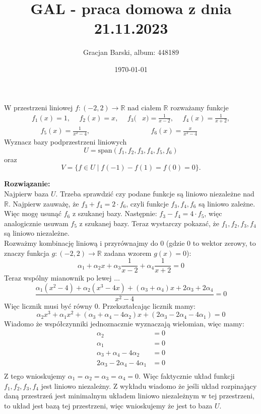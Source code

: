 \documentclass[11pt]{article}
\title{GAL - praca domowa z dnia 21.11.2023}
\author{Gracjan Barski, album: 448189}
\date{\today}
\newcommand{\R}{\mathbb{R}}
\newcommand{\al}{\alpha}
\begin{document}
\maketitle
\begin{center}
W przestrzeni liniowej $f\colon (-2, 2) \to \R$ nad ciałem $\R$ rozważamy funkcje
\begin{align*}
f_1(x) = 1, \hspace{15pt} f_2(x) = x, \hspace{15pt} f_3(&x) = \frac{1}{x-2}, \hspace{15pt} f_4(x) = \frac{1}{x+2}, \\  \hspace{15pt} f_5(x) = \frac{1}{x^2-4},& \hspace{15pt} f_6(x) = \frac{x}{x^2-4}
\end{align*}
Wyznacz bazy podprzestrzeni liniowych
$$U = \mathrm{span}(f_1,f_2,f_3,f_4,f_5,f_6)$$
oraz
$$V = \{f \in U \mid f(-1) - f(1) = f(0) = 0\}.$$
\end{center}
\textbf{Rozwiązanie:} \\[10pt]
Najpierw baza $U$. Trzeba sprawdzić czy podane funkcje są liniowo niezależne nad $\R$. Najpierw zauważę, że $f_3 + f_4 = 2 \cdot f_6$, czyli funkcje $f_3, f_4, f_6$ są liniowo zależne. Więc mogę usunąć $f_6$  z szukanej bazy. Następnie: $f_3 - f_4 = 4 \cdot f_5$, więc analogicznie usuwam $f_5$ z szukanej bazy. Teraz wystarczy pokazać, że $f_1, f_2, f_3, f_4$ są liniowo niezależne. \\[10pt]
Rozważmy kombinację liniową i przyrównajmy do 0 (gdzie 0 to wektor zerowy, to znaczy funkcja $g \colon (-2, 2) \to \R$ zadana wzorem $g(x) = 0$): 
$$\al_1 + \al_2 x + \al_3 \frac{1}{x-2} + \al_4 \frac{1}{x+2} = 0$$
Teraz wspólny mianownik po lewej $\ldots$
$$\frac{\al_1 (x^2-4) + \al_2 (x^3-4x) + (\al_3 + \al_4)x + 2\al_3 + 2\al_4}{x^2-4} = 0$$
Więc licznik musi być równy $0$. Przekształcając licznik mamy:
$$\al_2 x^3 + \al_1 x^2 + (\al_3+\al_4 - 4\al_2)x + (2\al_3 - 2\al_4 - 4\al_1) = 0$$
Wiadomo że współczynniki jednoznacznie wyznaczają wielomian, więc mamy:
\begin{align*}
    \al_2 &= 0 \\
    \al_1 &= 0 \\
    \al_3 + \al_4 - 4\al_2 &= 0 \\
    2\al_3 - 2\al_4 - 4\al_1 &= 0 \\
\end{align*}
Z tego wnioskujemy $\al_1 = \al_2 = \al_3 = \al_4 = 0$. Więc faktycznie układ funkcji $f_1, f_2, f_3, f_4$ jest liniowo niezależny. Z wykładu wiadomo że jeśli układ rozpinający daną przestrzeń jest minimalnym układem liniowo niezależnym w tej przestrzeni, to układ jest bazą tej przestrzeni, więc wnioskujemy że jest to baza $U$. \\[35pt] 
\end{document}
